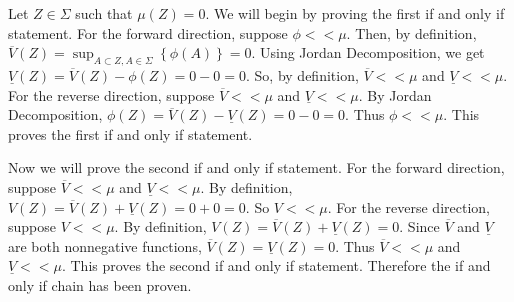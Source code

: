 \begin{solution}
  Let $Z \in \Sigma$ such that $\mu\left( Z \right) = 0$.
  We will begin by proving the first if and only if statement.
  For the forward direction, suppose $\phi < < \mu$.
  Then, by definition, $\overline{V}\left( Z \right) = \sup_{A \subset Z, A \in \Sigma}\left\{ \phi\left( A \right) \right\} = 0$.
  Using Jordan Decomposition, we get $\underline{V}\left( Z \right) = \overline{V}\left( Z \right) - \phi\left( Z \right) = 0 - 0 = 0$.
  So, by definition, $\overline{V} < < \mu$ and $\underline{V} < < \mu$.
  For the reverse direction, suppose $\overline{V} < < \mu$ and $\underline{V} < < \mu$.
  By Jordan Decomposition, $\phi(Z) = \overline{V}\left( Z \right) - \underline{V}\left( Z \right) = 0 - 0 = 0$.
  Thus $\phi < < \mu$.
  This proves the first if and only if statement.

  Now we will prove the second if and only if statement.
  For the forward direction, suppose $\overline{V} < < \mu$ and $\underline{V} < < \mu$.
  By definition, $V(Z) = \overline{V}\left( Z \right) + \underline{V}\left( Z \right) = 0 + 0 = 0$.
  So $V < < \mu$.
  For the reverse direction, suppose $V < < \mu$.
  By definition, $V\left( Z \right) = \overline{V}\left( Z \right) + \underline{V}\left( Z \right) = 0$.
  Since $\overline{V}$ and $\underline{V}$ are both nonnegative functions, $\overline{V}\left( Z \right) = \underline{V}\left( Z \right) = 0$.
  Thus $\overline{V} < < \mu$ and $\underline{V} < < \mu$.
  This proves the second if and only if statement.
  Therefore the if and only if chain has been proven.
\end{solution}
